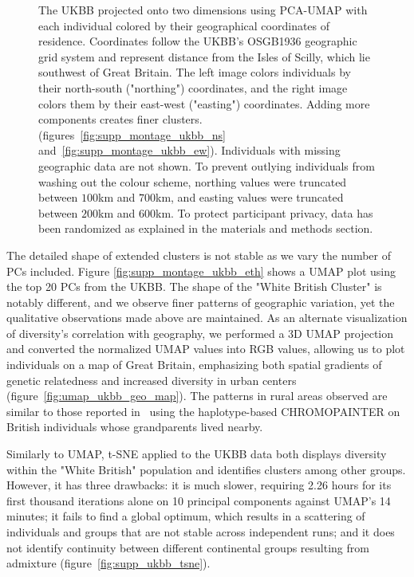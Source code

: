 \documentclass[12pt]{pnas-new}
\begin{document}
\begin{figure}
    \caption{The UKBB projected onto two dimensions using PCA-UMAP with each individual colored by their geographical coordinates of residence. Coordinates follow the UKBB's OSGB1936 geographic grid system and represent distance from the Isles of Scilly, which lie southwest of Great Britain. The left image colors individuals by their north-south ("northing") coordinates, and the right image colors them by their east-west ("easting") coordinates. Adding more components creates finer clusters.  (figures~\ref{fig:supp_montage_ukbb_ns} and~\ref{fig:supp_montage_ukbb_ew}). Individuals with missing geographic data are not shown. To prevent outlying individuals from washing out the colour scheme, northing values were truncated between $100$km and $700$km, and easting values were truncated between $200$km and $600$km. To protect participant privacy, data has been randomized as explained in the materials and methods section.}
    \label{fig:umap_ukbb_geo_osgb}
\end{figure}

The detailed shape of extended clusters is not stable as we vary the number of PCs included. Figure \ref{fig:supp_montage_ukbb_eth} shows a UMAP plot using the top 20 PCs from the UKBB. The shape of the "White British Cluster" is notably different, and we observe finer patterns of geographic variation, yet the qualitative observations made above are maintained. As an alternate visualization of diversity's correlation with geography, we performed a 3D UMAP projection and converted the normalized UMAP values into RGB values, allowing us to plot individuals on a map of Great Britain, emphasizing both spatial gradients of genetic relatedness and increased diversity in urban centers (figure~\ref{fig:umap_ukbb_geo_map}). The patterns in rural areas observed are similar to those reported in~\cite{leslie2015fine} using the haplotype-based CHROMOPAINTER on British individuals whose grandparents lived nearby.  

Similarly to UMAP, t-SNE applied to the UKBB data both displays diversity within the "White British" population and identifies clusters among other groups. However, it has three drawbacks: it is much slower, requiring 2.26 hours for its first thousand iterations alone on 10 principal components against UMAP's 14 minutes; it fails to find a global optimum, which results in a scattering of individuals and groups that are not stable across independent runs; and it does not identify continuity between different continental groups resulting from admixture (figure~\ref{fig:supp_ukbb_tsne}).     
\end{document}
